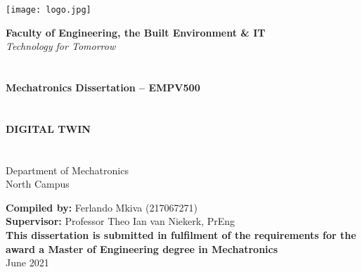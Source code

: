 
\begin{titlepage}
		
\texttt{[image: logo.jpg]}

\begin{leftbar}
	\noindent
	\textbf{\Large Faculty of Engineering, the Built Environment \& IT}\\
	\textit{\large Technology for Tomorrow}\\
	~\\~\\
	\textbf{\Large Mechatronics Dissertation – EMPV500}\\
	~\\~\\
	\textbf{\large\uppercase{Digital Twin}}\\
	~\\~\\
	\large{Department of Mechatronics}\\
	\large{North Campus}
\end{leftbar}
\vspace{1cm}

\begin{center}
	{\large	\textbf{Compiled by:} Ferlando Mkiva (217067271)\\[0.7cm]
		\textbf{Supervisor:} Professor Theo Ian van Niekerk, PrEng\\[0.7cm]
		
		\textbf{This dissertation is submitted in fulfilment of the requirements for the award a 
		Master of Engineering degree in Mechatronics}\\[0.7cm]
		
		June 2021}
\end{center}
\restoregeometry  
	
\end{titlepage}		
